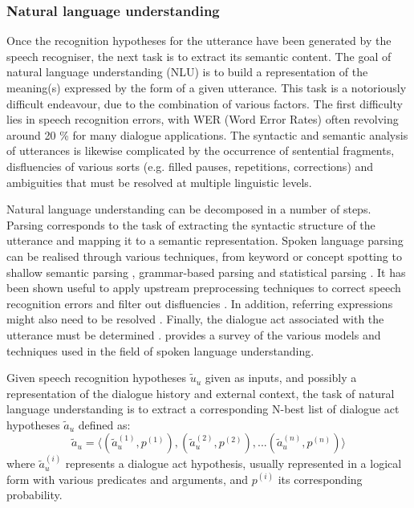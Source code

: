 \subsubsection*{Natural language understanding}
\label{section:speechunderstanding}

Once the recognition hypotheses for the utterance have been generated by the speech recogniser, the next task is to extract its semantic content.  The goal of natural language understanding (NLU) is to build a representation of the meaning(s) expressed by the form of a given utterance.  This task is a notoriously difficult endeavour, due to the combination of various factors. The first difficulty lies in speech recognition errors, with WER (Word Error Rates) often revolving around 20 \% for many dialogue applications.  The syntactic and semantic analysis of utterances is likewise complicated by the occurrence of sentential fragments,  disfluencies of various sorts (e.g. filled pauses, repetitions, corrections) and ambiguities that must be resolved at multiple linguistic levels. 

Natural language understanding can be decomposed in a number of steps.  Parsing corresponds to the task of extracting the syntactic structure of the utterance and mapping it to a semantic representation.  Spoken language parsing can be realised through various techniques, from keyword or concept spotting \citep{KomataniTKK01,ZhangZY07} to shallow semantic parsing \citep{Coppola:2009}, grammar-based parsing \citep{VanNoord1999} and statistical parsing \citep{He200585}.  It has been shown useful to apply upstream preprocessing techniques to correct speech recognition errors \citep{Ringger:1996} and filter out disfluencies \citep{Johnson:2004}. In addition, referring expressions might also need to be resolved \citep{Funakoshi:2012}.  Finally, the dialogue act associated with the utterance must be determined \citep{stolcke2000,Keizer2007}. \cite{demori2008} provides a survey of the various models and techniques used in the field of spoken language understanding. 

Given speech recognition hypotheses $\tilde{u}_u$ given as inputs, and possibly a representation of the dialogue history and external context, the task of natural language understanding is to extract a corresponding N-best list of dialogue act hypotheses $\tilde{a}_u$ defined as: \begin{equation*}
\tilde{a}_u = \langle (\tilde{a}_u^{(1)}, p^{(1)}), (\tilde{a}_u^{(2)}, p^{(2)}), ... (\tilde{a}_u^{(n)}, p^{(n)})\rangle
\end{equation*}
where $\tilde{a}_u^{(i)}$ represents a dialogue act hypothesis, usually represented in a logical form with various predicates and arguments, and $p^{(i)}$ its corresponding probability.

